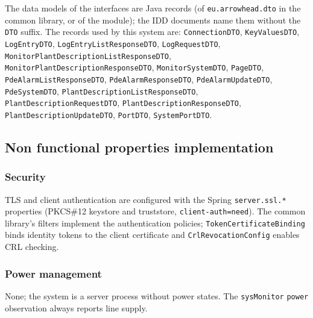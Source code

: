 \documentclass[a4paper]{arrowhead}
\begin{document}
The data models of the interfaces are Java records (of \texttt{eu.arrowhead.dto} in the common library, or of the module); the IDD documents name them without the \texttt{DTO} suffix. The records used by this system are: \texttt{ConnectionDTO}, \texttt{KeyValuesDTO}, \texttt{LogEntryDTO}, \texttt{Log\allowbreak{}Entry\allowbreak{}List\allowbreak{}Response\allowbreak{}DTO}, \texttt{LogRequestDTO}, \texttt{Monitor\allowbreak{}Plant\allowbreak{}Description\allowbreak{}List\allowbreak{}Response\allowbreak{}DTO}, \texttt{Monitor\allowbreak{}Plant\allowbreak{}Description\allowbreak{}Response\allowbreak{}DTO}, \texttt{MonitorSystemDTO}, \texttt{PageDTO}, \texttt{Pde\allowbreak{}Alarm\allowbreak{}List\allowbreak{}Response\allowbreak{}DTO}, \texttt{Pde\allowbreak{}Alarm\allowbreak{}Response\allowbreak{}DTO}, \texttt{PdeAlarmUpdateDTO}, \texttt{PdeSystemDTO}, \texttt{Plant\allowbreak{}Description\allowbreak{}List\allowbreak{}Response\allowbreak{}DTO}, \texttt{Plant\allowbreak{}Description\allowbreak{}Request\allowbreak{}DTO}, \texttt{Plant\allowbreak{}Description\allowbreak{}Response\allowbreak{}DTO}, \texttt{Plant\allowbreak{}Description\allowbreak{}Update\allowbreak{}DTO}, \texttt{PortDTO}, \texttt{SystemPortDTO}.

\subsection{Non functional properties implementation}

\subsubsection{Security}

TLS and client authentication are configured with the Spring \texttt{server.\allowbreak{}ssl.\allowbreak{}*} properties (PKCS\#12 keystore and truststore, \texttt{client-\allowbreak{}auth=\allowbreak{}need}). The common library's filters implement the authentication policies; \texttt{Token\allowbreak{}Certificate\allowbreak{}Binding} binds identity tokens to the client certificate and \texttt{Crl\allowbreak{}Revocation\allowbreak{}Config} enables CRL checking.

\subsubsection{Power management}

None; the system is a server process without power states. The \texttt{sysMonitor} \texttt{power} observation always reports line supply.
\end{document}
